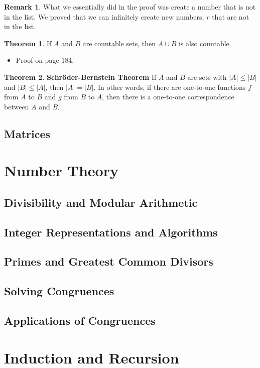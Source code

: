 \documentclass[article, 11pt]{article}
\theoremstyle{definition}
\newtheorem*{remark}{Remark}
\newtheorem{theorem}{Theorem}[subsubsection]
\newcommand{\unite}{\cup}
\begin{document}
    \begin{remark}
        What we essentially did in the proof was create a number that is not in the list. We proved that we can infinitely create new numbers, $r$ that are not in the list. 
    \end{remark}
    \begin{theorem}
        If $A$ and $B$ are countable sets, then $A \unite B$ is also countable.
        \begin{itemize}
            \item Proof on page 184.
        \end{itemize}
    \end{theorem}
    \begin{theorem}
        \textbf{Schröder-Bernstein Theorem} If $A$ and $B$ are sets with $|A| \leq |B|$ and $|B| \leq |A|$, then $|A| = |B|$. In other words, if there are one-to-one functions $f$ from $A$ to $B$ and $g$ from $B$ to $A$, then there is a one-to-one correspondence between $A$ and $B$.
    \end{theorem}
    \subsection{Matrices}
    \section{Number Theory}
    \subsection{Divisibility and Modular Arithmetic}
    \subsection{Integer Representations and Algorithms}
    \subsection{Primes and Greatest Common Divisors}
    \subsection{Solving Congruences}
    \subsection{Applications of Congruences}
    \section{Induction and Recursion}
\end{document}
